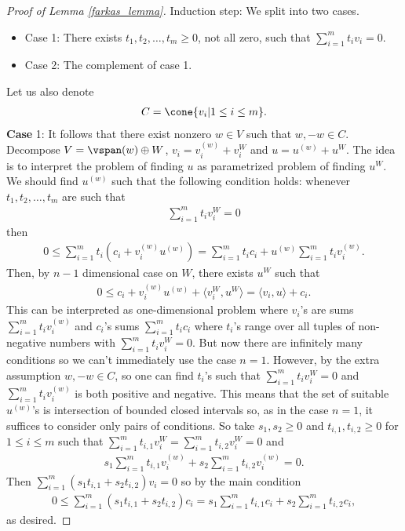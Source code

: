 \begin{proof}[Proof of Lemma \ref{farkas_lemma}]
	Induction step: We split into two cases.
	\begin{itemize}
		\item Case 1: There exists $t_{1}, t_{2}, \ldots, t_{m} \geq 0$, not all zero, such that $\sum_{i = 1}^{m} t_{i} v_{i} = 0$.
		\item Case 2: The complement of case 1.
	\end{itemize}
	Let us also denote
	\begin{align*}
		C = \cone \{v_{i} | 1 \leq i \leq m\}.
	\end{align*}
	\textbf{Case} 1: It follows that there exist nonzero $w \in V$ such that $w, -w \in C$. Decompose $V = \vspan(w) \oplus W$, $v_{i} = v_{i}^{(w)} + v_{i}^{W}$ and $u = u^{(w)} + u^{W}$. The idea is to interpret the problem of finding $u$ as parametrized problem of finding $u^{W}$. We should find $u^{(w)}$ such that the following condition holds: whenever $t_{1}, t_{2}, \ldots, t_{m}$ are such that
	\begin{align*}
		\sum_{i = 1}^{m} t_{i} v_{i}^{W} = 0
	\end{align*}
	then
	\begin{align*}
		0 \leq \sum_{i = 1}^{m} t_{i} (c_{i} + v_{i}^{(w)} u^{(w)}) = \sum_{i = 1}^{m} t_{i} c_{i} + u^{(w)}\sum_{i = 1}^{m} t_{i} v_{i}^{(w)}.
	\end{align*}
	Then, by $n - 1$ dimensional case on $W$, there exists $u^{W}$ such that
	\begin{align*}
		0 \leq c_{i} + v_{i}^{(w)} u^{(w)} + \langle v_{i}^{W}, u^{W} \rangle = \langle v_{i}, u \rangle + c_{i}.
	\end{align*}
	This can be interpreted as one-dimensional problem where $v_{i}$'s are sums $\sum_{i = 1}^{m} t_{i} v_{i}^{(w)}$ and $c_{i}$'s sums $\sum_{i = 1}^{m} t_{i} c_{i}$ where $t_{i}$'s range over all tuples of non-negative numbers with $\sum_{i = 1}^{m} t_{i} v_{i}^{W} = 0$. But now there are infinitely many conditions so we can't immediately use the case $n = 1$. However, by the extra assumption $w, -w \in C$, so one can find $t_{i}$'s such that $\sum_{i = 1}^{m} t_{i} v_{i}^{W} = 0$ and $\sum_{i = 1}^{m} t_{i} v_{i}^{(w)}$ is both positive and negative. This means that the set of suitable $u^{(w)}$'s is intersection of bounded closed intervals so, as in the case $n = 1$, it suffices to consider only pairs of conditions. So take $s_{1}, s_{2} \geq 0$ and $t_{i, 1}, t_{i, 2} \geq 0$ for $1 \leq i \leq m$ such that $\sum_{i = 1}^{m} t_{i, 1} v_{i}^{W} = \sum_{i = 1}^{m} t_{i, 2} v_{i}^{W} = 0$ and
	\begin{align*}
		s_{1} \sum_{i = 1}^{m} t_{i, 1} v_{i}^{(w)} + s_{2} \sum_{i = 1}^{m} t_{i, 2} v_{i}^{(w)} = 0.
	\end{align*}
	Then $\sum_{i = 1}^{m} \left(s_{1} t_{i, 1} + s_{2} t_{i, 2} \right) v_{i} = 0$ so by the main condition
	\begin{align*}
		0 \leq \sum_{i = 1}^{m} \left(s_{1} t_{i, 1} + s_{2} t_{i, 2} \right) c_{i} = s_{1} \sum_{i = 1}^{m} t_{i, 1} c_{i} + s_{2}\sum_{i = 1}^{m} t_{i, 2} c_{i},
	\end{align*}
	as desired.


\end{proof}
